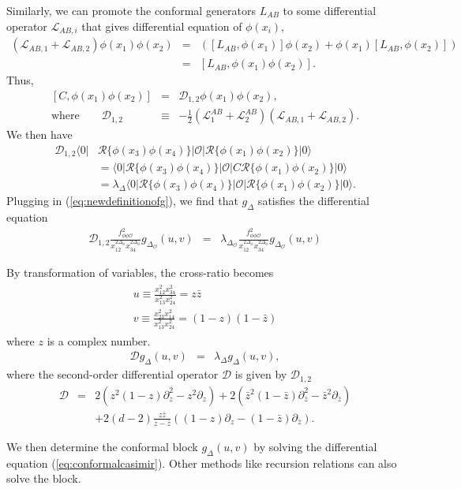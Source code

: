 \documentclass[12pt]{article}
\numberwithin{equation}{section}
\newcommand\be{\begin{eqnarray}}
\newcommand\ee{\end{eqnarray}}
\newcommand\f\phi
\newcommand\cO{\mathcal{O}}
\newcommand\p[1]{\left(#1\right)}
\newcommand\ptl\partial
\newcommand\<\langle
\renewcommand\>\rangle
\newcommand\nn{\nonumber}
\renewcommand\.{\cdot}
\newcommand\De{\Delta}
\renewcommand\l\lambda
\newcommand\cL{\mathcal{L}}
\newcommand\cD{\mathcal{D}}
\begin{document}
Similarly, we can promote the conformal generators $L_{AB}$ to some differential operator $\cL_{AB,i}$ that gives differential equation of $\f(x_i)$,
\be
(\cL_{AB,1}+\cL_{AB,2})\f(x_1)\f(x_2) &=& \p{[L_{AB},\f(x_1)]\f(x_2)+\f(x_1)[L_{AB},\f(x_2)]}\nn\\
&=& \left[L_{AB}, \f(x_1)\f(x_2)\right].
\ee
Thus, 
\be
\left[C, \f(x_1)\f(x_2)\right] &=& \cD_{1,2}\f(x_1)\f(x_2),\nn\\
\textrm{where}\qquad\cD_{1,2} &\equiv& -\frac 1 2(\cL^{AB}_{1}+\cL^{AB}_{2})(\cL_{AB,1}+\cL_{AB,2}).
\ee
We then have
\begin{align}
\cD_{1,2}\<0|&\mathcal{R}\{\f(x_3)\f(x_4)\}|\cO|\mathcal{R}\{\f(x_1)\f(x_2)\}|0\>\nn\\
&=
\<0|\mathcal{R}\{\f(x_3)\f(x_4)\}|\cO| C\mathcal{R}\{\f(x_1)\f(x_2)\}|0\>\nn\\
&= \l_{\De}\<0|\mathcal{R}\{\f(x_3)\f(x_4)\}|\cO|\mathcal{R}\{\f(x_1)\f(x_2)\}|0\>.
\end{align}
Plugging in (\ref{eq:newdefinitionofg}), we find that $g_{\De}$ satisfies the differential equation 
\be
\label{eq:conformalcasimir1}
\cD_{1,2} \frac{f_{\f\f\cO}^2}{x_{12}^{2\De_\f}x_{34}^{2\De_\f}}g_{\De_\cO}(u,v) &=& \lambda_{\Delta_\cO} \frac{f_{\f\f\cO}^2}{x_{12}^{2\De_\f}x_{34}^{2\De_\f}}g_{\De_\cO}(u,v)
\ee

By transformation of variables, the cross-ratio becomes
\be
\label{eq:crossratio}
\begin{split}
    u\equiv \frac{x_{12}^2x_{34}^2}{x_{13}^2x_{24}^2} = z\bar{z}\\
    v\equiv \frac{x_{23}^2x_{14}^2}{x_{13}^2x_{24}^2} = (1-z)(1-\bar{z})
\end{split}
\ee
where $z$ is a complex number.
\be
\label{eq:conformalcasimir}
\cD g_{\De}(u,v) &=& \l_{\De} g_{\De}(u,v),
\ee
where the second-order differential operator $\cD$ is given by $\cD_{1,2}$
\be
\cD &=& 2(z^2(1-z)\ptl_z^2-z^2 \ptl_z) + 2(\bar z^2 (1-\bar z)\ptl_{\bar z}^2-\bar z^2 \ptl_{\bar z})\nn\\
&& + 2(d-2)\frac{z\bar z}{z-\bar z}((1-z)\ptl_z - (1-\bar z)\ptl_{\bar z}).
\ee

We then determine the conformal block $g_{\Delta}(u,v)$ by solving the differential equation (\ref{eq:conformalcasimir}).
Other methods like recursion relations can also solve the block.
\end{document}
